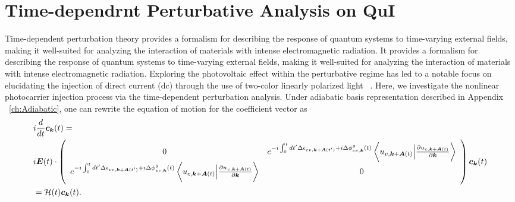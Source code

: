 \section{Time-dependrnt Perturbative Analysis on QuI \label{sec:deriveperturbation}}
Time-dependent perturbation theory provides a formalism for describing the response of quantum systems to time-varying external fields, making it well-suited for analyzing the interaction of materials with intense electromagnetic radiation. It provides a formalism for describing the response of quantum systems to time-varying external fields, making it well-suited for analyzing the interaction of materials with intense electromagnetic radiation. 
Exploring the photovoltaic effect within the perturbative regime has led to a notable focus on elucidating the injection of direct current (dc) through the use of two-color linearly polarized light ~\cite{PhysRevLett.74.3596,PhysRevLett.76.1703,PhysRevLett.78.306,Sun2010,PhysRevB.100.075202,HeideBoolakeeEcksteinHommelhoff+2021+3701+3707,PhysRevLett.123.067402}. 
Here, we investigate the nonlinear photocarrier injection process via the time-dependent perturbation analysis.
Under adiabatic basis representation described in Appendix ~\ref{ch:Adiabatic}, one can rewrite the equation of motion for the coefficient vector as
\begin{align}
&i\frac{d}{dt} \boldsymbol c_{\boldsymbol k}(t) = 
 \nonumber \\
& i\boldsymbol E(t)\cdot \left(
    \begin{array}{cc}
      0 & 
      e^{-i\int^t_0dt' \Delta \epsilon_{cv,\boldsymbol k+ \boldsymbol A(t')}+i \Delta \phi^g_{cv,\boldsymbol k}(t)} 
  \left \langle u_{v,\boldsymbol k+\boldsymbol A(t)}\Big |\frac{\partial u_{c,\boldsymbol k+\boldsymbol A(t)}}{\partial \boldsymbol k} \right \rangle \\
      e^{-i\int^t_0dt' \Delta \epsilon_{vc,\boldsymbol k+ \boldsymbol A(t')}+i \Delta \phi^g_{vc,\boldsymbol k}(t)} 
  \left \langle u_{c,\boldsymbol k+\boldsymbol A(t)}\Big |\frac{\partial u_{v,\boldsymbol k+\boldsymbol A(t)}}{\partial \boldsymbol k} \right \rangle &
      0
    \end{array}
    \right) \boldsymbol c_{\boldsymbol k}(t) \nonumber \\
&= \mathcal{H}(t) \boldsymbol c_{\boldsymbol k}(t)
.
\label{eq:tdse-ad-basis}
\end{align}

